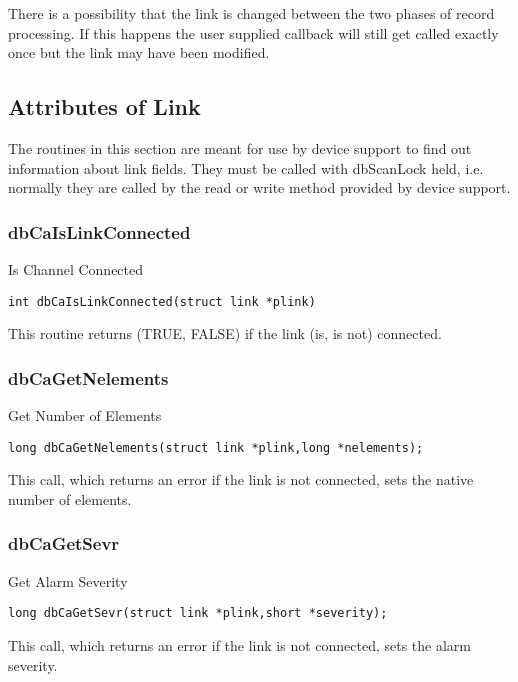 There is a possibility that the link is changed between the two phases of record processing.
If this happens the user supplied callback will still get called exactly once but the link may have been modified.

\subsection{Attributes of Link}

The routines in this section are meant for use by device support to find out information about link fields.
They must be called with dbScanLock held, i.e. normally they are called by the read or write method provided by device support.

\subsubsection{dbCaIsLinkConnected}

Is Channel Connected

\begin{verbatim}
int dbCaIsLinkConnected(struct link *plink)
\end{verbatim}

This routine returns (TRUE, FALSE) if the link (is, is not) connected.

\subsubsection{dbCaGetNelements}

Get Number of Elements

\begin{verbatim}
long dbCaGetNelements(struct link *plink,long *nelements);
\end{verbatim}

This call, which returns an error if the link is not connected, sets the native number of elements.

\subsubsection{dbCaGetSevr}

Get Alarm Severity

\begin{verbatim}
long dbCaGetSevr(struct link *plink,short *severity);
\end{verbatim}

This call, which returns an error if the link is not connected, sets the alarm severity.

